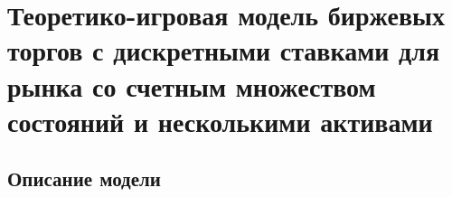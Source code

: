 \chapter{Теоретико-игровая модель биржевых торгов с дискретными ставками для
  рынка со счетным множеством состояний и несколькими активами} \label{chapt3}

\section{Описание модели}

\clearpage

